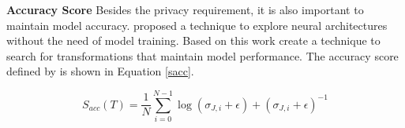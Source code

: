 \textbf{Accuracy Score}
Besides the privacy requirement, it is also important to maintain model accuracy. \citeauthor{mellor2021neural} \cite{mellor2021neural} proposed a technique to explore neural architectures without the need of model training. Based on this work \citeauthor{gao2021privacy} create a technique to search for transformations that maintain model performance. The accuracy score defined by \citeauthor{gao2021privacy} is shown in Equation \ref{sacc}.






\begin{equation}
    \label{sacc}
    S_{acc}(T) = \frac{1}{N} \sum^{N-1}_{i=0} \log(\sigma_{J,i} + \epsilon) + (\sigma_{J,i} + \epsilon)^{-1}
\end{equation}

